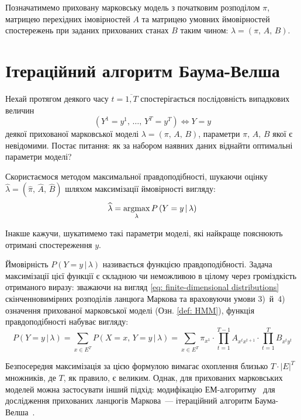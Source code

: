 Позначатимемо приховану марковську модель з початковим розподілом $\pi$, матрицею перехідних імовірностей $A$ та матрицею умовних ймовірностей спостережень при заданих прихованих станах $B$ таким чином: $\lambda=(\pi,\,A,\,B)$.

\section{Ітераційний алгоритм Баума-Велша}

Нехай протягом деякого часу $t=\overline{1,T}$ спостерігається послідовність випадкових величин 
\begin{equation*}
    \left( Y^1=y^1,\,\ldots,\,Y^T=y^T \right) \Longleftrightarrow Y=y
\end{equation*}
деякої прихованої марковської моделі $\lambda=(\pi,\,A,\,B)$, параметри $\pi,\,A,\,B$ якої є невідомими. Постає питання: як за набором наявних даних віднайти оптимальні параметри моделі?

Скористаємося методом максимальної правдоподібності, шукаючи оцінку $\widehat{\lambda}=(\widehat{\pi},\,\widehat{A},\,\widehat{B})$ шляхом максимізації ймовірності вигляду:
\begin{equation*}
    \widehat{\lambda}=\operatorname*{argmax}\limits_{\lambda} P\left( Y=y \,|\, \lambda \right)
\end{equation*}

Інакше кажучи, шукатимемо такі параметри моделі, які найкраще пояснюють отримані спостереження $y$. 

Ймовірність $P\left( Y=y \,|\, \lambda \right)$ називається функцією правдоподібності. Задача максимізації цієї функції є складною чи неможливою в цілому через громіздкість отриманого виразу: зважаючи на вигляд \eqref{eq: finite-dimensional distributions} скінченновимірних розподілів ланцюга Маркова та враховуючи умови 3)~й~4) означення прихованої марковської моделі (Озн. \ref{def: HMM}), функція правдоподібності набуває вигляду:
\begin{equation}\label{eq: likelihood function}
    P\left( Y=y \,|\, \lambda \right) = \sum\limits_{x \in E^T} P\left( X=x,\, Y=y \,|\, \lambda \right) = \sum\limits_{x \in E^T} \pi_{x^1} \cdot \prod\limits_{t=1}^{T-1} A_{x^t x^{t+1}} \cdot \prod\limits_{t=1}^{T} B_{x^ty^t} 
\end{equation}

Безпосередня максимізація за цією формулою вимагає охоплення близько $T\cdot|E|^T$ множників, де $T$, як правило, є великим. Однак, для прихованих марковських моделей можна застосувати інший підхід: модифікацію ЕМ-алгоритму~\cite[розділ 4]{Koski2001} для дослідження прихованих ланцюгів Маркова~--- ітераційний алгоритм Баума-Велша~\cite[розділ 15]{Koski2001}. 

